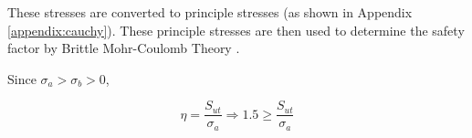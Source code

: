 \documentclass[../main.tex]{subfiles}
\begin{document}
These stresses are converted to principle stresses (as shown in Appendix \ref{appendix:cauchy}). These principle stresses are then used to determine the safety factor by Brittle Mohr-Coulomb Theory \cite[227]{shigley}.

Since $\sigma _a > \sigma _b > 0$,

\begin{equation}
	\eta = \dfrac{S_{ut}}{\sigma _a} \Rightarrow 1.5 \geq \dfrac{S_{ut}}{\sigma _a}
\end{equation}
\end{document}
